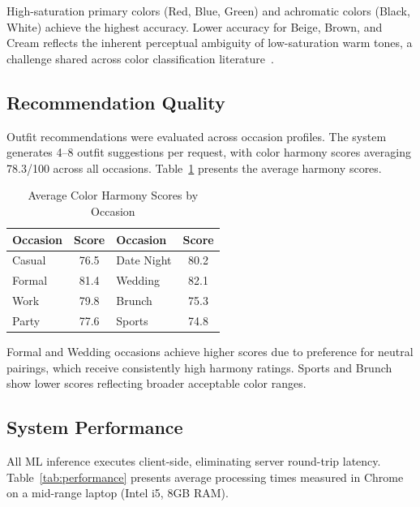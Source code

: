 \documentclass[conference]{IEEEtran}
\begin{document}
High-saturation primary colors (Red, Blue, Green) and achromatic colors (Black, White) achieve the highest accuracy. Lower accuracy for Beige, Brown, and Cream reflects the inherent perceptual ambiguity of low-saturation warm tones, a challenge shared across color classification literature~\cite{hasler2003}.

\subsection{Recommendation Quality}

Outfit recommendations were evaluated across occasion profiles. The system generates 4--8 outfit suggestions per request, with color harmony scores averaging 78.3/100 across all occasions. Table~\ref{tab:recommendation} presents the average harmony scores.

\begin{table}[htbp]
\caption{Average Color Harmony Scores by Occasion}
\begin{center}
\begin{tabular}{lc|lc}
\toprule
\textbf{Occasion} & \textbf{Score} & \textbf{Occasion} & \textbf{Score} \\
\midrule
Casual & 76.5 & Date Night & 80.2 \\
Formal & 81.4 & Wedding & 82.1 \\
Work & 79.8 & Brunch & 75.3 \\
Party & 77.6 & Sports & 74.8 \\
\bottomrule
\end{tabular}
\end{center}
\label{tab:recommendation}
\end{table}

Formal and Wedding occasions achieve higher scores due to preference for neutral pairings, which receive consistently high harmony ratings. Sports and Brunch show lower scores reflecting broader acceptable color ranges.

\subsection{System Performance}

All ML inference executes client-side, eliminating server round-trip latency. Table~\ref{tab:performance} presents average processing times measured in Chrome on a mid-range laptop (Intel i5, 8GB RAM).
\end{document}
